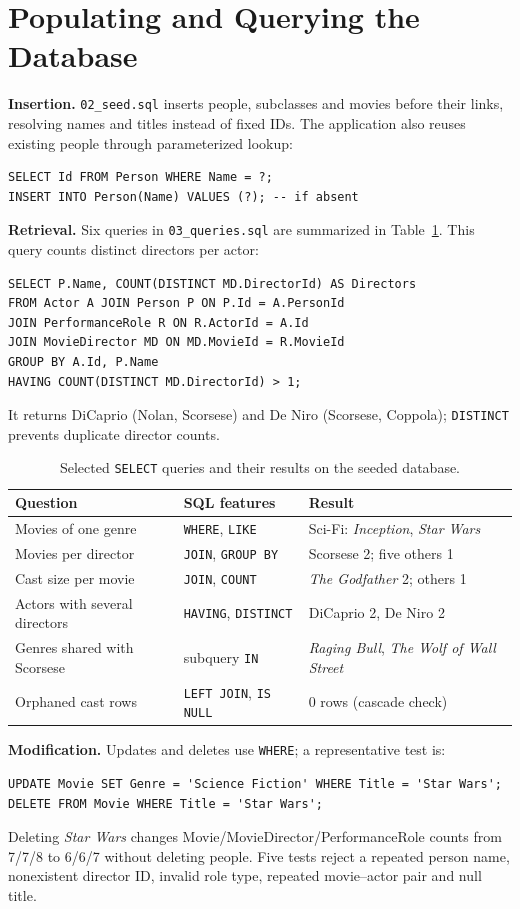 \documentclass[sigconf,nonacm]{acmart}
\newcommand{\tn}[1]{\texttt{#1}}
\begin{document}
\section{Populating and Querying the Database}
\textbf{Insertion.} \tn{02\_seed.sql} inserts people, subclasses and movies before their links, resolving names and titles instead of fixed IDs. The application also reuses existing people through parameterized lookup:
\begin{lstlisting}[language=SQLite]
SELECT Id FROM Person WHERE Name = ?;
INSERT INTO Person(Name) VALUES (?); -- if absent
\end{lstlisting}
\textbf{Retrieval.} Six queries in \tn{03\_queries.sql} are summarized in Table~\ref{tab:queries}. This query counts distinct directors per actor:
\begin{lstlisting}[language=SQLite]
SELECT P.Name, COUNT(DISTINCT MD.DirectorId) AS Directors
FROM Actor A JOIN Person P ON P.Id = A.PersonId
JOIN PerformanceRole R ON R.ActorId = A.Id
JOIN MovieDirector MD ON MD.MovieId = R.MovieId
GROUP BY A.Id, P.Name
HAVING COUNT(DISTINCT MD.DirectorId) > 1;
\end{lstlisting}
It returns DiCaprio (Nolan, Scorsese) and De Niro (Scorsese, Coppola); \tn{DISTINCT} prevents duplicate director counts.
\begin{table}[t]
\caption{Selected \tn{SELECT} queries and their results on the seeded database.}\label{tab:queries}
\footnotesize\setlength{\tabcolsep}{3pt}\begin{tabular}{@{}p{.9in}p{.8in}p{1.3in}@{}}\toprule
\textbf{Question} & \textbf{SQL features} & \textbf{Result}\\\midrule
Movies of one genre & \tn{WHERE}, \tn{LIKE} & Sci-Fi: \emph{Inception}, \emph{Star Wars}\\
Movies per director & \tn{JOIN}, \tn{GROUP BY} & Scorsese 2; five others 1\\
Cast size per movie & \tn{JOIN}, \tn{COUNT} & \emph{The Godfather} 2; others 1\\
Actors with several directors & \tn{HAVING}, \tn{DISTINCT} & DiCaprio 2, De Niro 2\\
Genres shared with Scorsese & subquery \tn{IN} & \emph{Raging Bull}, \emph{The Wolf of Wall Street}\\
Orphaned cast rows & \tn{LEFT JOIN}, \tn{IS NULL} & 0 rows (cascade check)\\\bottomrule
\end{tabular}
\end{table}
\textbf{Modification.} Updates and deletes use \tn{WHERE}; a representative test is:
\begin{lstlisting}[language=SQLite]
UPDATE Movie SET Genre = 'Science Fiction' WHERE Title = 'Star Wars';
DELETE FROM Movie WHERE Title = 'Star Wars';
\end{lstlisting}
Deleting \emph{Star Wars} changes Movie/MovieDirector/PerformanceRole counts from 7/7/8 to 6/6/7 without deleting people. Five tests reject a repeated person name, nonexistent director ID, invalid role type, repeated movie--actor pair and null title.
\end{document}
